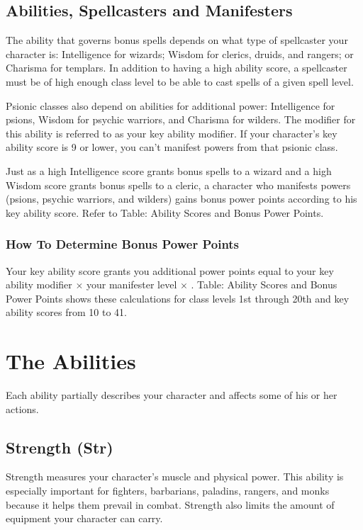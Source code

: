 \documentclass[10pt,a4paper,twocolumn]{d20}
\begin{document}
\subsection{Abilities, Spellcasters and Manifesters}
The ability that governs bonus spells depends on what type of spellcaster your character is: Intelligence for wizards; Wisdom for clerics, druids, and rangers; or Charisma for templars. In addition to having a high ability score, a spellcaster must be of high enough class level to be able to cast spells of a given spell level.

Psionic classes also depend on abilities for additional power: Intelligence for psions, Wisdom for psychic warriors, and Charisma for wilders. The modifier for this ability is referred to as your key ability modifier. If your character’s key ability score is 9 or lower, you can’t manifest powers from that psionic class.

Just as a high Intelligence score grants bonus spells to a wizard and a high Wisdom score grants bonus spells to a cleric, a character who manifests powers (psions, psychic warriors, and wilders) gains bonus power points according to his key ability score. Refer to Table: Ability Scores and Bonus Power Points.

\subsubsection{How To Determine Bonus Power Points}
Your key ability score grants you additional power points equal to your key ability modifier $\times$ your manifester level $\times$ . Table: Ability Scores and Bonus Power Points shows these calculations for class levels 1st through 20th and key ability scores from 10 to 41.

\section{The Abilities}
Each ability partially describes your character and affects some of his or her actions.

\subsection{Strength (Str)}
Strength measures your character’s muscle and physical power. This ability is especially important for fighters, barbarians, paladins, rangers, and monks because it helps them prevail in combat. Strength also limits the amount of equipment your character can carry.
\end{document}
